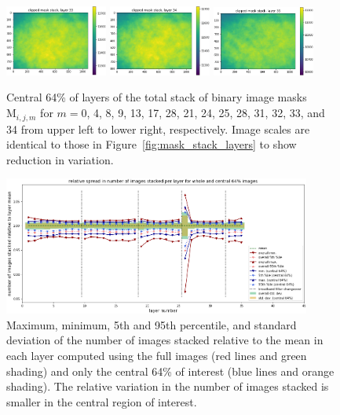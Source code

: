\documentclass[letterpaper,11pt]{article}
\newcommand{\reffig}[1]{Figure~\ref{#1}}
\newcommand{\Mu}{\mathrm{M}}
\begin{document}
\begin{figure}[!ht]
\includegraphics[width=0.3\textwidth]{images/measuring_flatfield_corrections/clipped_mask_stack_layers/clipped_mask_stack_layer_33}
\includegraphics[width=0.3\textwidth]{images/measuring_flatfield_corrections/clipped_mask_stack_layers/clipped_mask_stack_layer_34}
\includegraphics[width=0.3\textwidth]{images/measuring_flatfield_corrections/clipped_mask_stack_layers/clipped_mask_stack_layer_35}
\caption{\footnotesize Central 64\% of layers of the total stack of binary image masks $\Mu_{i,j,m}$ for $m=$0, 4, 8, 9, 13, 17, 28, 21, 24, 25, 28, 31, 32, 33, and 34 from upper left to lower right, respectively. Image scales are identical to those in \reffig{fig:mask_stack_layers} to show reduction in variation.}
\label{fig:clipped_mask_stack_layers}
\end{figure}

\begin{figure}[!ht]
\centering
\includegraphics[width=0.90\textwidth]{images/measuring_flatfield_corrections/mask_stack_variation_reduction}
\caption{\footnotesize Maximum, minimum, 5th and 95th percentile, and standard deviation of the number of images stacked relative to the mean in each layer computed using the full images (red lines and green shading) and only the central 64\% of interest (blue lines and orange shading). The relative variation in the number of images stacked is smaller in the central region of interest.}
\label{fig:removing_image_edges_effect_on_mask_stacks}
\end{figure} 
\end{document}

